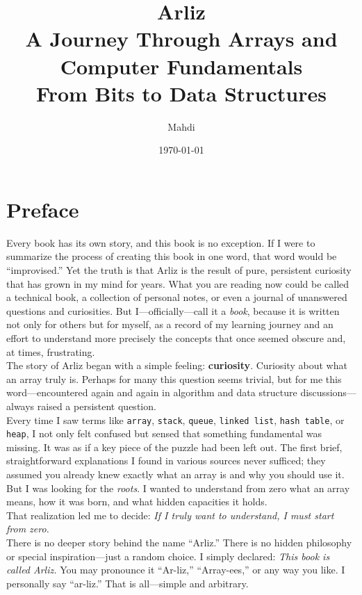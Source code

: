 \documentclass[12pt, oneside]{book}
\title{{\Huge\textbf{Arliz}}\\[0.5em]
	{\LARGE A Journey Through Arrays and Computer Fundamentals}\\[1em]
	{\large From Bits to Data Structures}}
\author{{\LARGE Mahdi}} %
\date{{\large \today}} %
\begin{document}
	\frontmatter
	\mainmatter
	\maketitle
	\tableofcontents
	\renewcommand{\arraystretch}{1.5} %
	\newpage
	\section{Preface}
	
	Every book has its own story, and this book is no exception. If I were to summarize the process of creating this book in one word, that word would be “improvised.” Yet the truth is that Arliz is the result of pure, persistent curiosity that has grown in my mind for years. What you are reading now could be called a technical book, a collection of personal notes, or even a journal of unanswered questions and curiosities. But I—officially—call it a \emph{book}, because it is written not only for others but for myself, as a record of my learning journey and an effort to understand more precisely the concepts that once seemed obscure and, at times, frustrating.\\
	The story of Arliz began with a simple feeling: \textbf{curiosity}.  
	Curiosity about what an array truly is. Perhaps for many this question seems trivial, but for me this word—encountered again and again in algorithm and data structure discussions—always raised a persistent question.\\
	Every time I saw terms like \texttt{array}, \texttt{stack}, \texttt{queue}, \texttt{linked list}, \texttt{hash table}, or \texttt{heap}, I not only felt confused but sensed that something fundamental was missing. It was as if a key piece of the puzzle had been left out. The first brief, straightforward explanations I found in various sources never sufficed; they assumed you already knew exactly what an array is and why you should use it. But I was looking for the \emph{roots}. I wanted to understand from zero what an array means, how it was born, and what hidden capacities it holds.\\
	That realization led me to decide:  
	\emph{If I truly want to understand, I must start from zero.}\\	
	There is no deeper story behind the name “Arliz.” There is no hidden philosophy or special inspiration—just a random choice. I simply declared:  
	\emph{This book is called Arliz.}  
	You may pronounce it “Ar-liz,” “Array-ees,” or any way you like. I personally say “ar-liz.” That is all—simple and arbitrary.\\	
\end{document}

